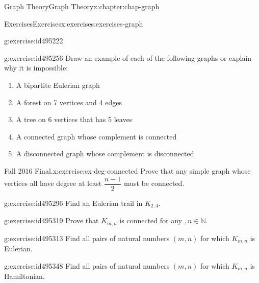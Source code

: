 \documentclass[oneside,10pt,]{book}
\numberwithin{equation}{section}
\begin{document}
\begin{chapterptx}{Graph Theory}{}{Graph Theory}{}{}{x:chapter:chap-graph}
\begin{exercises-section}{Exercises}{}{Exercises}{}{}{x:exercises:exercises-graph}
\begin{divisionexercise}{25}{}{}{g:exercise:id495222}
\begin{sidebyside}{1}{0.38}{0.38}{0}
\begin{sbspanel}{0.24}
{
}%
\end{sbspanel}%
\end{sidebyside}%
\end{divisionexercise}%
\begin{divisionexercise}{26}{}{}{g:exercise:id495256}%
Draw an example of each of the following graphs or explain why it is impossible:%
\begin{enumerate}[label=(\alph*)]
\item{}A bipartite Eulerian graph%
\item{}A forest on 7 vertices and 4 edges%
\item{}A tree on 6 vertices that has 5 leaves%
\item{}A connected graph whose complement is connected%
\item{}A disconnected graph whose complement is disconnected%
\end{enumerate}
%
\end{divisionexercise}%
\begin{divisionexercise}{27}{Fall 2016 Final.}{}{x:exercise:ex-deg-connected}%
Prove that any simple graph whose vertices all have degree at least \(\dfrac{n-1}{2}\) must be connected.%
\end{divisionexercise}%
\begin{divisionexercise}{28}{}{}{g:exercise:id495296}%
Find an Eulerian trail in \(K_{2,4}\).%
\end{divisionexercise}%
\begin{divisionexercise}{29}{}{}{g:exercise:id495319}%
Prove that \(K_{m,n}\) is connected for any \(,n \in \mathbb{N}\).%
\end{divisionexercise}%
\begin{divisionexercise}{30}{}{}{g:exercise:id495313}%
Find all pairs of natural numbers \((m,n)\) for which \(K_{m,n}\) is Eulerian.%
\end{divisionexercise}%
\begin{divisionexercise}{31}{}{}{g:exercise:id495348}%
Find all pairs of natural numbers \((m,n)\) for which \(K_{m,n}\) is Hamiltonian.%
\end{divisionexercise}%

\end{exercises-section}
\end{chapterptx}
\end{document}
